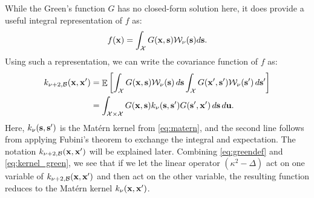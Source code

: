 \documentclass[aos,preprint]{imsart}
\theoremstyle{plain}
\DeclareMathOperator{\E}{\mathbb E}
\newcommand{\CalX}{\mathcal X}
\newcommand{\Bs}{\bold s}
\newcommand{\BFx}{\bold x}
\newcommand{\CalW}{\mathcal{W}}
\theoremstyle{remark}
\begin{document}
While the Green's function $G$ has no closed-form solution here, it does provide a useful integral representation of $f$ as:
\begin{equation}
\label{eq:Green_SPDE}
    f(\BFx)=\int_{\CalX}G(\BFx,\Bs)\CalW_\nu(\Bs)d\Bs.
\end{equation}
Using such a representation, we can write the covariance function of $f$ as:
\begin{align}
    k_{\nu+2,\mathcal{B}}(\BFx,\BFx') 
    &= \E\left[\int_{\CalX} G(\BFx, \Bs) \CalW_\nu(\Bs) \, d\Bs \int_{\CalX} G(\BFx', \bold{s}') \CalW_\nu(\bold{s}') \, d\bold{s}' \right] \nonumber \\
    &= \int_{\CalX \times \CalX} G(\BFx, \Bs) k_\nu(\Bs, \bold{s}') G(\bold{s}', \BFx') \, d\Bs \, d\bold{u}.
    \label{eq:kernel_green}
\end{align}
Here, $k_\nu(\Bs, \bold{s}')$ is the Mat\'ern kernel from \eqref{eq:matern}, and the second line follows from applying Fubini's theorem to exchange the integral and expectation. The notation $k_{\nu+2,\mathcal{B}}(\BFx,\BFx')$ will be explained later. Combining \eqref{eq:greendef} and \eqref{eq:kernel_green}, we see that if we let the linear operator \((\kappa^2 - \Delta)\) act on one variable of \(k_{\nu+2,\mathcal{B}}(\BFx, \BFx')\) and then act on the other variable, the resulting function reduces to the Mat\'ern kernel \(k_\nu(\BFx, \BFx')\).


\end{document}
